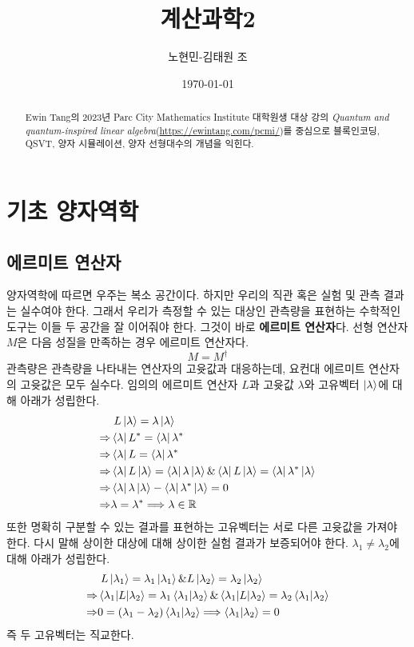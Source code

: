 \documentclass[a4paper,atbegshi,chapter,]{oblivoir}
\title{계산과학2}
\author{노현민-김태원 조}
\date{\today}
\begin{document}
\maketitle
\begin{abstract}
Ewin Tang의 2023년 Parc City Mathematics Institute 대학원생 대상 강의
{\slshape Quantum and quantum-inspired linear algebra}(\url{https://ewintang.com/pcmi/})를
중심으로 블록인코딩, QSVT, 양자 시뮬레이션, 양자 선형대수의 개념을 익힌다. 
\end{abstract}\newpage
\tableofcontents
\setcounter{chapter}{-1}
\chapter{기초 양자역학}
\section{에르미트 연산자}
양자역학에 따르면 우주는 복소 공간이다. 하지만 우리의 직관 혹은 실험 및 관측 결과는
실수여야 한다. 그래서 우리가 측정할 수 있는 대상인 관측량을 표현하는 수학적인 도구는
이들 두 공간을 잘 이어줘야 한다. 그것이 바로 \textbf{에르미트 연산자}다. 선형 연산자
$M$은 다음 성질을 만족하는 경우 에르미트 연산자다. 
\[
  M = M^{\dagger}
\]
관측량은 관측량을 나타내는 연산자의 고윳값과 대응하는데, 요컨대 에르미트 연산자의
고윳값은 모두 실수다. 임의의 에르미트 연산자 $L$과 고윳값 $\lambda$와 고유벡터
$\ket{\lambda}$에 대해 아래가 성립한다.
\begin{align*}
  &\;L\ket{\lambda} = \lambda\ket{\lambda} \\
  \Rightarrow & \bra{\lambda}L^* = \bra{\lambda}\lambda^* \\
  \Rightarrow & \bra{\lambda}L=\bra{\lambda}\lambda^* \\
  \Rightarrow & \bra{\lambda}L\ket{\lambda} =\bra{\lambda}\lambda\ket{\lambda} \&
  \bra{\lambda}L\ket{\lambda} = \bra{\lambda}\lambda^*\ket{\lambda} \\
  \Rightarrow&\bra{\lambda}\lambda\ket{\lambda} - \bra{\lambda}\lambda^*\ket{\lambda} = 0\\
  \Rightarrow & \lambda = \lambda^* \Longrightarrow \lambda\in\mathbb{R}
\end{align*}
또한 명확히 구분할 수 있는 결과를 표현하는 고유벡터는 서로 다른 고윳값을 가져야 한다.
다시 말해 상이한 대상에 대해 상이한 실험 결과가 보증되어야 한다. $\lambda_1\neq\lambda_2$에
대해 아래가 성립한다.
\begin{align*}
  &\;L\ket{\lambda_1}=\lambda_1\ket{\lambda_1}\&L\ket{\lambda_2}=\lambda_2\ket{\lambda_2}\\
  \Rightarrow&\braket{\lambda_1|L|\lambda_2} = \lambda_1\braket{\lambda_1|\lambda_2} \&
  \braket{\lambda_1|L|\lambda_2}=\lambda_2\braket{\lambda_1|\lambda_2}\\
  \Rightarrow & 0 = (\lambda_1-\lambda_2)\braket{\lambda_1|\lambda_2}
  \Longrightarrow \braket{\lambda_1|\lambda_2} = 0
\end{align*}
즉 두 고유벡터는 직교한다. 
\end{document}
